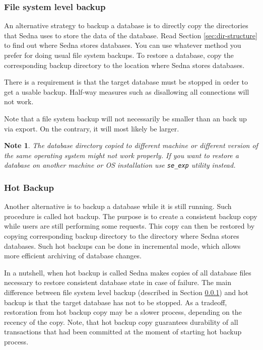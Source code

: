 \documentclass[a4paper,12pt]{article}
\newtheorem{note}{Note}
\begin{document}
\subsubsection{File system level backup}
\label{sec:file-system-level-backup}
An alternative strategy to backup a database is to directly copy the directories that Sedna
uses to store the data of the database. Read Section \ref{sec:dir-structure} to find out where
Sedna stores databases. You can use whatever method you prefer for doing usual file system backups.
To restore a database, copy the corresponding backup directory to the location where Sedna stores
databases.

There is a requirement is that the target database must be stopped in order to get a usable backup.
Half-way measures such as disallowing all connections will not work.

Note that a file system backup will not necessarily be smaller than an back up via export. On 
the contrary, it will most likely be larger.

\begin{note}
The database directory copied to different machine or different version of the same operating system 
might not work properly. If you want to restore a database on another machine or OS installation use
\verb!se_exp! utility instead.
\end{note}


\subsubsection{Hot Backup}

Another alternative is to backup a database while it is still running. Such procedure is called hot backup.
The purpose is to create a consistent backup copy while users are still performing some requests. This copy can then be
restored by copying corresponding backup directory to the directory where Sedna stores databases. Such hot backups
can be done in incremental mode, which allows more efficient archiving of database changes.

In a nutshell, when hot backup is called Sedna makes copies of all database files necessary to restore consistent
database state in case of failure. The main difference between file system level backup (described in Section \ref{sec:file-system-level-backup}) and
hot backup is that the target database has not to be stopped. As a tradeoff, restoration from hot backup copy may
be a slower process, depending on the recency of the copy. Note, that hot backup copy guarantees durability of all 
transactions that had been committed at the moment of starting hot backup process. 
\end{document}
